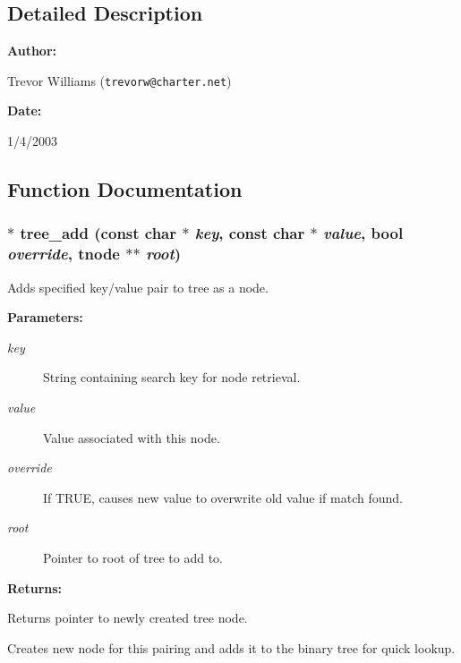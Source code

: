 \subsection{Detailed Description}


\begin{Desc}
\item[{\bf Author: }]\par
Trevor Williams ({\tt trevorw@charter.net}) \end{Desc}
\begin{Desc}
\item[{\bf Date: }]\par
1/4/2003

\end{Desc}


\subsection{Function Documentation}
\subsubsection{ $\ast$ tree\_\-add (const char $\ast$ {\em key}, const char $\ast$ {\em value}, {\bf bool} {\em override}, {\bf tnode} $\ast$$\ast$ {\em root})}\label{tree_8c_a0}


Adds specified key/value pair to tree as a node.

\begin{Desc}
\item[{\bf Parameters: }]\par
\begin{description}
\item[
{\em key}]String containing search key for node retrieval. \item[
{\em value}]Value associated with this node. \item[
{\em override}]If TRUE, causes new value to overwrite old value if match found. \item[
{\em root}]Pointer to root of tree to add to.

\end{description}
\end{Desc}
\begin{Desc}
\item[{\bf Returns: }]\par
Returns pointer to newly created tree node.

\end{Desc}
Creates new node for this pairing and adds it to the binary tree for quick lookup. 
